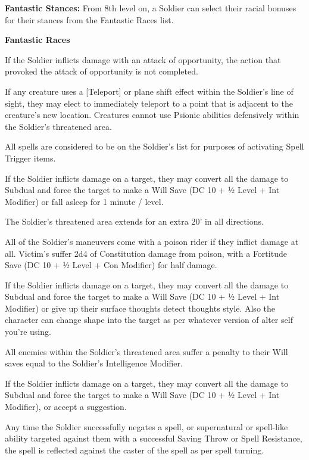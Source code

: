 \textbf{Fantastic Stances:} From 8th level on, a Soldier can select their racial bonuses for their stances from the Fantastic Races list.

\textbf{Fantastic Races}
\begin{description*}
\item[Ogre:] If the Soldier inflicts damage with an attack of opportunity, the action that provoked the attack of opportunity is not completed.
\item[Starfolk:] If any creature uses a [Teleport] or plane shift effect within the Soldier's line of sight, they may elect to immediately teleport to a point that is adjacent to the creature's new location. Creatures cannot use Psionic abilities defensively within the Soldier's threatened area.
\item[Yakfolk:] All spells are considered to be on the Soldier's list for purposes of activating Spell Trigger items.
\item[Pixie:] If the Soldier inflicts damage on a target, they may convert all the damage to Subdual and force the target to make a Will Save (DC 10 + ½ Level + Int Modifier) or fall asleep for 1 minute / level.
\item[Kyton:] The Soldier's threatened area extends for an extra 20' in all directions.
\item[Snakefolk:] All of the Soldier's maneuvers come with a poison rider if they inflict damage at all. Victim's suffer 2d4 of Constitution damage from poison, with a Fortitude Save (DC 10 + ½ Level + Con Modifier) for half damage.
\item[Doppelg\:{a}nger:] If the Soldier inflicts damage on a target, they may convert all the damage to Subdual and force the target to make a Will Save (DC 10 + ½ Level + Int Modifier) or give up their surface thoughts detect thoughts style. Also the character can change shape into the target as per whatever version of alter self you're using.
\item[Beefolk:] All enemies within the Soldier's threatened area suffer a penalty to their Will saves equal to the Soldier's Intelligence Modifier.
\item[Succubus:] If the Soldier inflicts damage on a target, they may convert all the damage to Subdual and force the target to make a Will Save (DC 10 + ½ Level + Int Modifier), or accept a suggestion.
\item[Nerra:] Any time the Soldier successfully negates a spell, or supernatural or spell-like ability targeted against them with a successful Saving Throw or Spell Resistance, the spell is reflected against the caster of the spell as per spell turning.
\end{description*}

